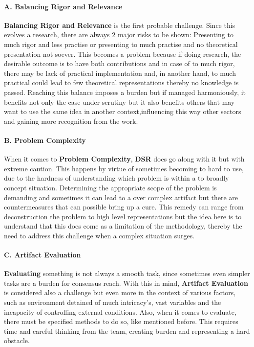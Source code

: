 \paragraph{A. Balancing Rigor and Relevance}\mbox{}

\textbf{Balancing Rigor and Relevance} is the first probable challenge. Since this evolves a research, there are always 2 major risks to be shown: Presenting to much rigor and less practise or presenting to much practise and no theoretical presentation not soever. This becomes a problem because if doing research, the desirable outcome is to have both contributions and in case of to much rigor, there may be lack of practical implementation and, in another hand, to much practical could lead to few theoretical representations thereby no knowledge is passed. Reaching this balance imposes a burden but if managed harmoniously, it benefits not only the case under scrutiny but it also benefits others that may want to use the same idea in another context,influencing this way other sectors and gaining more recognition from the work.
\paragraph{B. Problem Complexity} \mbox{}

When it comes to \textbf{Problem Complexity}, \textbf{DSR} does go along with it but with extreme caution. This happens by virtue of sometimes becoming to hard to use, due to the hardness of understanding which problem is within a to broadly concept situation. Determining the appropriate scope of the problem is demanding and sometimes it can lead to a over complex artifact but there are countermeasures that can possible bring up a cure. This remedy can range from deconstruction the problem to high level representations but the idea here is to understand that this does come as a limitation of the methodology, thereby the need to address this challenge when a complex situation surges.

\paragraph{C. Artifact Evaluation} \mbox{}

\textbf{Evaluating} something is not always a smooth task, since sometimes even simpler tasks are a burden for consensus reach. With this in mind, \textbf{Artifact Evaluation} is considered also a challenge but even more in the context of various factors, such as environment detained of much intricacy's, vast variables and the incapacity of controlling external conditions. Also, when it comes to evaluate, there must be specified methods to do so, like mentioned before. This requires time and careful thinking from the team, creating burden and representing a hard obstacle. 

